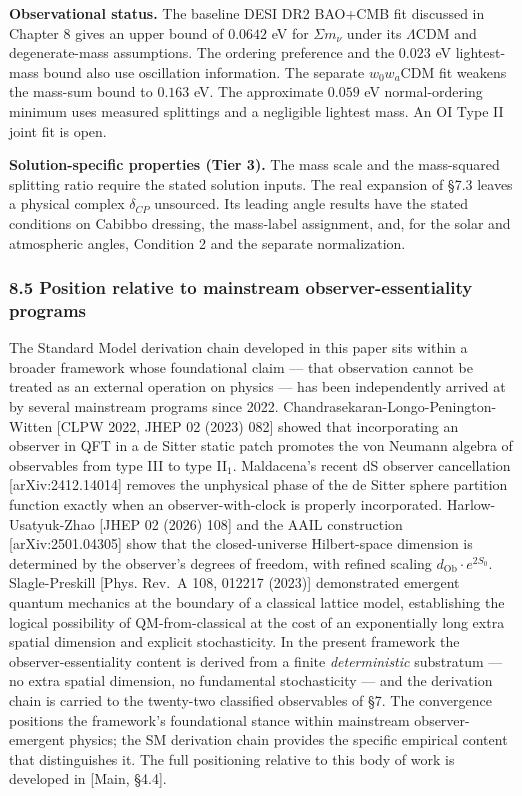 \documentclass[
]{article}
\begin{document}
\textbf{Observational status.} The baseline DESI DR2 BAO+CMB fit
discussed in Chapter 8 gives an upper bound of \(0.0642\) eV for
\(\Sigma m_\nu\) under its \(\Lambda\)CDM and degenerate-mass
assumptions. The ordering preference and the \(0.023\) eV lightest-mass
bound also use oscillation information. The separate \(w_0w_a\)CDM fit
weakens the mass-sum bound to \(0.163\) eV. The approximate \(0.059\) eV
normal-ordering minimum uses measured splittings and a negligible
lightest mass. An OI Type II joint fit is open.

\textbf{Solution-specific properties (Tier 3).} The mass scale and the
mass-squared splitting ratio require the stated solution inputs. The
real expansion of §7.3 leaves a physical complex \(\delta_{CP}\)
unsourced. Its leading angle results have the stated conditions on
Cabibbo dressing, the mass-label assignment, and, for the solar and
atmospheric angles, Condition 2 and the separate normalization.

\hypertarget{position-relative-to-mainstream-observer-essentiality-programs}{%
\subsubsection{8.5 Position relative to mainstream observer-essentiality
programs}\label{position-relative-to-mainstream-observer-essentiality-programs}}

The Standard Model derivation chain developed in this paper sits within
a broader framework whose foundational claim --- that observation cannot
be treated as an external operation on physics --- has been
independently arrived at by several mainstream programs since 2022.
Chandrasekaran-Longo-Penington-Witten {[}CLPW 2022, JHEP 02 (2023)
082{]} showed that incorporating an observer in QFT in a de Sitter
static patch promotes the von Neumann algebra of observables from type
III to type II\(_1\). Maldacena's recent dS observer cancellation
{[}arXiv:2412.14014{]} removes the unphysical phase of the de Sitter
sphere partition function exactly when an observer-with-clock is
properly incorporated. Harlow-Usatyuk-Zhao {[}JHEP 02 (2026) 108{]} and
the AAIL construction {[}arXiv:2501.04305{]} show that the
closed-universe Hilbert-space dimension is determined by the observer's
degrees of freedom, with refined scaling
\(d_{\text{Ob}} \cdot e^{2S_0}\). Slagle-Preskill {[}Phys. Rev.~A 108,
012217 (2023){]} demonstrated emergent quantum mechanics at the boundary
of a classical lattice model, establishing the logical possibility of
QM-from-classical at the cost of an exponentially long extra spatial
dimension and explicit stochasticity. In the present framework the
observer-essentiality content is derived from a finite
\emph{deterministic} substratum --- no extra spatial dimension, no
fundamental stochasticity --- and the derivation chain is carried to the
twenty-two classified observables of §7. The convergence positions the
framework's foundational stance within mainstream observer-emergent
physics; the SM derivation chain provides the specific empirical content
that distinguishes it. The full positioning relative to this body of
work is developed in {[}Main, §4.4{]}.
\end{document}
